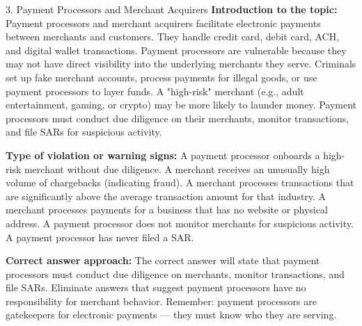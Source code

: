 \documentclass[11pt,a4paper]{beamer}
\begin{document}
\begin{frame}{3. Payment Processors and Merchant Acquirers}
\tiny
\noindent\textbf{Introduction to the topic:} Payment processors and merchant acquirers facilitate electronic payments between merchants and customers. They handle credit card, debit card, ACH, and digital wallet transactions. Payment processors are vulnerable because they may not have direct visibility into the underlying merchants they serve. Criminals set up fake merchant accounts, process payments for illegal goods, or use payment processors to layer funds. A "high-risk" merchant (e.g., adult entertainment, gaming, or crypto) may be more likely to launder money. Payment processors must conduct due diligence on their merchants, monitor transactions, and file SARs for suspicious activity.

\vspace{0.1cm}
\noindent\textbf{Type of violation or warning signs:} A payment processor onboards a high-risk merchant without due diligence. A merchant receives an unusually high volume of chargebacks (indicating fraud). A merchant processes transactions that are significantly above the average transaction amount for that industry. A merchant processes payments for a business that has no website or physical address. A payment processor does not monitor merchants for suspicious activity. A payment processor has never filed a SAR.

\vspace{0.1cm}
\noindent\textbf{Correct answer approach:} The correct answer will state that payment processors must conduct due diligence on merchants, monitor transactions, and file SARs. Eliminate answers that suggest payment processors have no responsibility for merchant behavior. Remember: payment processors are gatekeepers for electronic payments — they must know who they are serving.
\end{frame}
\end{document}
